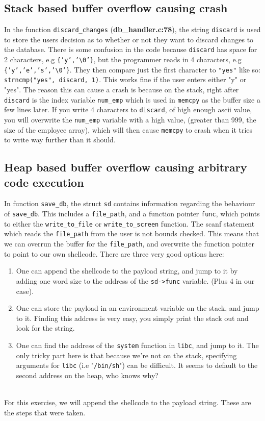 \documentclass[]{article}
\begin{document}
\subsection*{Stack based buffer overflow causing crash}
In the function \texttt{discard\_changes} (\textbf{db\_handler.c:78}), the string \texttt{discard} is used to store the users decision as to whether or not they want to discard changes to the database. There is some confusion in the code because \texttt{discard} has space for 2 characters, e.g \texttt{\{'y','\textbackslash0'\}}, but the programmer reads in 4 characters, e.g \texttt{\{'y','e','s','\textbackslash0'\}}. They then compare just the first character to \texttt{"yes"} like so: \texttt{strncmp("yes", discard, 1)}. This works fine if the user enters either "y" or "yes". The reason this can cause a crash is because on the stack, right after \texttt{discard} is the index variable \texttt{num\_emp} which is used in \texttt{memcpy} as the buffer size a few lines later. If you write 4 characters to \texttt{discard}, of high enough ascii value, you will overwrite the \texttt{num\_emp} variable with a high value, (greater than 999, the size of the employee array), which will then cause \texttt{memcpy} to crash when it tries to write way further than it should.

\subsection*{Heap based buffer overflow causing arbitrary code execution}
In function \texttt{save\_db}, the struct \texttt{sd} contains information regarding the behaviour of \texttt{save\_db}. This includes a \texttt{file\_path}, and a function pointer \texttt{func}, which points to either the \texttt{write\_to\_file} or \texttt{write\_to\_screen} function. The scanf statement which reads the \texttt{file\_path} from the user is not bounds checked. This means that we can overrun the buffer for the \texttt{file\_path}, and overwrite the function pointer to point to our own shellcode.
There are three very good options here:
\begin{enumerate}
	\item One can append the shellcode to the payload string, and jump to it by adding one word size to the address of the \texttt{sd->func} variable. (Plus 4 in our case).
	\item One can store the payload in an environment variable on the stack, and jump to it. Finding this address is very easy, you simply print the stack out and look for the string.
	\item One can find the address of the \texttt{system} function in \texttt{libc}, and jump to it. The only tricky part here is that because we're not on the stack, specifying arguments for \texttt{libc} (i.e "\texttt{/bin/sh}") can be difficult. It seems to default to the second address on the heap, who knows why?
\end{enumerate} 
 \\
For this exercise, we will append the shellcode to the payload string. These are the steps that were taken.
\end{document}
